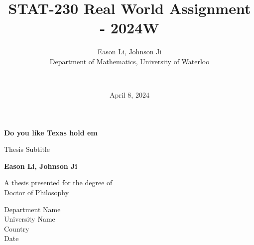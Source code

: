 \documentclass{article}
\title{STAT-230 Real World Assignment - 2024W}
\author{
    Eason Li, Johnson Ji \\
    Department of Mathematics, University of Waterloo \and \\
}
\date{April 8, 2024} %
\begin{document}
\begin{titlepage}
    \begin{center}
        \vspace*{1cm}
            
        \Huge
        \textbf{Do you like Texas hold em}
            
        \vspace{0.5cm}
        \LARGE
        Thesis Subtitle
            
        \vspace{1.5cm}
            
        \textbf{Eason Li, Johnson Ji}
            
        \vfill
            
        A thesis presented for the degree of\\
        Doctor of Philosophy
            
        \vspace{0.8cm}
            
        \Large
        Department Name\\
        University Name\\
        Country\\
        Date
            
    \end{center}
\end{titlepage}
\end{document}
